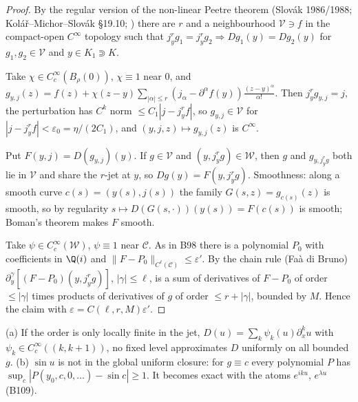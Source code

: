 \begin{proof}
By the regular version of the non-linear Peetre theorem (Slov\'ak 1986/1988; Kol\'a\v r--Michor--Slov\'ak \S19.10; \cf) there are $r$ and a neighbourhood $\mathcal V\ni f$ in the compact-open $C^\infty$ topology such that $j^r_yg_1=j^r_yg_2\Rightarrow Dg_1(y)=Dg_2(y)$ for $g_1,g_2\in\mathcal V$ and $y\in K_1\Supset K$.

Take $\chi\in C^\infty_c(B_\rho(0))$, $\chi\equiv1$ near $0$, and $g_{y,j}(z)=f(z)+\chi(z-y)\sum_{|\alpha|\le r}(j_\alpha-\partial^\alpha f(y))\frac{(z-y)^\alpha}{\alpha!}$. Then $j^r_yg_{y,j}=j$, the perturbation has $C^k$ norm $\le C_1|j-j^r_yf|$, so $g_{y,j}\in\mathcal V$ for $|j-j^r_yf|<\varepsilon_0=\eta/(2C_1)$, and $(y,j,z)\mapsto g_{y,j}(z)$ is $C^\infty$.

Put $F(y,j)=D(g_{y,j})(y)$. If $g\in\mathcal V$ and $(y,j^r_yg)\in\mathcal W$, then $g$ and $g_{y,j^r_yg}$ both lie in $\mathcal V$ and share the $r$-jet at $y$, so $Dg(y)=F(y,j^r_yg)$. Smoothness: along a smooth curve $c(s)=(y(s),j(s))$ the family $G(s,z)=g_{c(s)}(z)$ is smooth, so by regularity $s\mapsto D(G(s,\cdot))(y(s))=F(c(s))$ is smooth; Boman's theorem makes $F$ smooth.

Take $\psi\in C^\infty_c(\mathcal W)$, $\psi\equiv1$ near $\mathcal C$. As in B98 there is a polynomial $P_0$ with coefficients in $\Q(i)$ and $\|F-P_0\|_{C^\ell(\mathcal C)}\le\varepsilon'$. By the chain rule (Fa\`a di Bruno) $\partial^\gamma_y[(F-P_0)(y,j^r_yg)]$, $|\gamma|\le\ell$, is a sum of derivatives of $F-P_0$ of order $\le|\gamma|$ times products of derivatives of $g$ of order $\le r+|\gamma|$, bounded by $M$. Hence the claim with $\varepsilon=C(\ell,r,M)\varepsilon'$.

\end{proof}

\begin{caution}[title=Where it stops]
(a) If the order is only locally finite in the jet, $D(u)=\sum_k\psi_k(u)\partial^k_xu$ with $\psi_k\in C^\infty_c((k,k+1))$, no fixed level approximates $D$ uniformly on all bounded $g$. (b) $\sin u$ is not in the global uniform closure: for $g\equiv c$ every polynomial $P$ has $\sup_c|P(y_0,c,0,\dots)-\sin c|\ge1$. It becomes exact with the atoms $e^{iku}$, $e^{\lambda u}$ (B109).
\end{caution}

